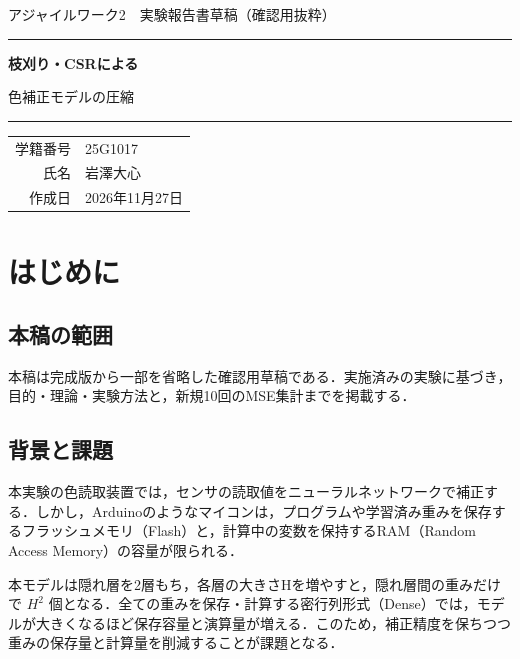 \documentclass[
  10pt,
  a4paper,
]{article}
\author{}
\date{}
\renewcommand{\arraystretch}{1.15}
\begin{document}
\hypersetup{pageanchor=false}
\begin{titlepage}
\centering
\vspace*{22mm}
{\Large アジャイルワーク2　実験報告書草稿（確認用抜粋）\par}
\vspace{24mm}
\rule{0.88\linewidth}{0.7pt}\par
\vspace{9mm}
{\Huge\bfseries 枝刈り・CSRによる\par 色補正モデルの圧縮\par}
\vspace{9mm}
\rule{0.88\linewidth}{0.7pt}\par
\vfill
\renewcommand{\arraystretch}{1.6}
{\large
\begin{tabular}{rl}
学籍番号 & 25G1017 \\
氏名 & 岩澤大心 \\
作成日 & 2026年11月27日\end{tabular}
}
\vspace*{25mm}
\end{titlepage}
\hypersetup{pageanchor=true}
\setcounter{page}{1}

\section{はじめに}\label{ux306fux3058ux3081ux306b}

\subsection{本稿の範囲}\label{ux672cux7a3fux306eux7bc4ux56f2}

本稿は完成版から一部を省略した確認用草稿である．実施済みの実験に基づき，目的・理論・実験方法と，新規10回のMSE集計までを掲載する．

\subsection{背景と課題}\label{ux80ccux666fux3068ux8ab2ux984c}

本実験の色読取装置では，センサの読取値をニューラルネットワークで補正する．しかし，Arduinoのようなマイコンは，プログラムや学習済み重みを保存するフラッシュメモリ（Flash）と，計算中の変数を保持するRAM（Random
Access Memory）の容量が限られる．

本モデルは隠れ層を2層もち，各層の大きさHを増やすと，隠れ層間の重みだけで
\(H^2\)
個となる．全ての重みを保存・計算する密行列形式（Dense）では，モデルが大きくなるほど保存容量と演算量が増える．このため，補正精度を保ちつつ重みの保存量と計算量を削減することが課題となる．
\end{document}
